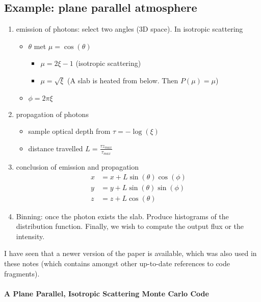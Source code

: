 \documentclass[../main/main.tex]{subfiles}
\begin{document}
\subsection{Example: plane parallel atmosphere}
\begin{enumerate}

\item emission of photons: select two angles (3D space). In isotropic scattering
\begin{itemize}
\item $\theta$ met $\mu = \cos(\theta)$
	\begin{itemize}
	\item $\mu = 2\xi -1$ (isotropic scattering)
	\item $\mu = \sqrt{\xi}$ (A slab is heated from below. Then $P(\mu) = \mu$)
	\end{itemize}
\item $\phi = 2 \pi \xi$
\end{itemize}

\item propagation of photons
\begin{itemize}
\item sample optical depth from $\tau = -\log(\xi)$
\item distance travelled $L = \frac{\tau z_{max}}{\tau_{max}}$
\end{itemize}

\item conclusion of emission and propagation
\begin{equation}
\begin{aligned}
x &= x + L \sin(\theta) \cos(\phi) \\
y &= y + L \sin(\theta) \sin(\phi) \\
z &= z + L \cos(\theta)
\end{aligned}
\end{equation}

\item Binning: once the photon exists the slab. Produce histograms of the distribution function. Finally, we wish to compute the output flux or the intensity.
\end{enumerate}

I have seen that a newer version of the paper is available, which was also used in these notes (which contains amongst other up-to-date references to code fragments).

\paragraph{A Plane Parallel, Isotropic Scattering Monte Carlo Code}
\end{document}
